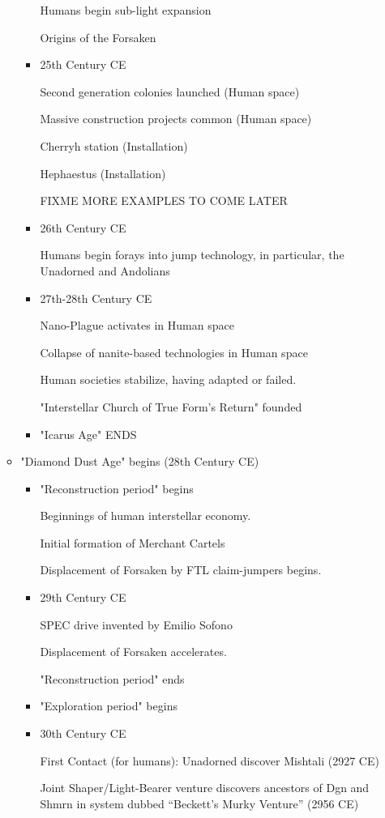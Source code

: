 \begin{itemize}
\begin{itemize}
\begin{itemize}
Humans begin sub-light expansion 

Origins of the Forsaken 

\item	25th Century CE 

Second generation colonies launched (Human space) 

Massive construction projects common (Human space) 

Cherryh station (Installation)

Hephaestus (Installation)

FIXME MORE EXAMPLES TO COME LATER 
\item	26th Century CE 

Humans begin forays into jump technology, in particular, the Unadorned
and Andolians

\item	27th-28th Century CE 

Nano-Plague activates in Human space 

Collapse of nanite-based technologies in Human space 

Human societies stabilize, having adapted or failed. 

"Interstellar Church of True Form's Return" founded 

\item "Icarus Age" ENDS 
\end{itemize}
\item "Diamond Dust Age" begins (28th Century CE) 
\begin{itemize}
\item	"Reconstruction period" begins 

Beginnings of human interstellar economy. 

Initial formation of Merchant Cartels 

Displacement of Forsaken by FTL claim-jumpers begins. 

\item	29th Century CE 

SPEC drive invented by Emilio Sofono 

Displacement of Forsaken accelerates. 

"Reconstruction period" ends 

\item	"Exploration period" begins 
\item	30th Century CE 

First Contact (for humans): Unadorned discover Mishtali (2927 CE)

Joint Shaper/Light-Bearer venture discovers ancestors of Dgn and Shmrn
in system dubbed ``Beckett's Murky Venture'' (2956 CE)


\end{itemize}
\end{itemize}
\end{itemize}
